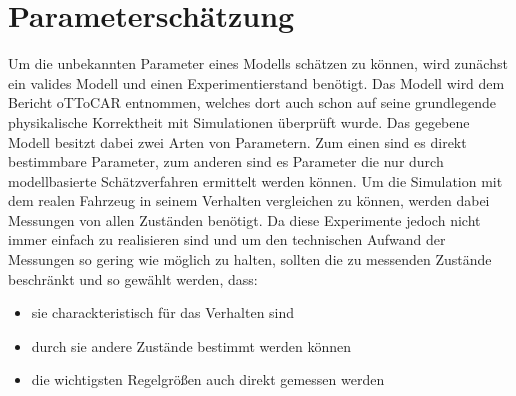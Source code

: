 \section{Parameterschätzung}
Um die unbekannten Parameter eines Modells schätzen zu können, wird zunächst ein valides Modell und einen Experimentierstand benötigt. Das Modell wird dem Bericht oTToCAR \cite[Seite 12]{VikAnd} entnommen, welches dort auch schon auf seine grundlegende physikalische Korrektheit mit Simulationen überprüft wurde. Das gegebene Modell besitzt dabei zwei Arten von Parametern. Zum einen sind es direkt bestimmbare Parameter, zum anderen sind es Parameter die nur durch modellbasierte Schätzverfahren ermittelt werden können. Um die Simulation mit dem realen Fahrzeug in seinem Verhalten vergleichen zu können, werden dabei Messungen von allen Zuständen benötigt. Da diese Experimente jedoch nicht immer einfach zu realisieren sind und um den technischen Aufwand der Messungen so gering wie möglich zu halten, sollten die zu messenden Zustände beschränkt und so gewählt werden, dass:    
\begin{itemize}
	\item sie charackteristisch für das Verhalten sind
	\item durch sie andere Zustände bestimmt werden können
	\item die wichtigsten Regelgrößen auch direkt gemessen werden
\end{itemize}
